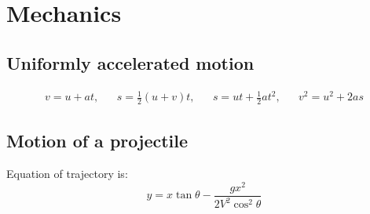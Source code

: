 \documentclass[../"Formula sheet.tex"]{subfiles}
\begin{document}
\section{Mechanics}

\subsection{Uniformly accelerated motion}
\begin{align}
    v = u + at,  &&  s = \frac{1}{2}(u+v)t,  &&  s = ut + \frac{1}{2}at^2,  &&  v^2 = u^2 + 2as
\end{align}

\subsection{Motion of a projectile}
\quad \enspace{} Equation of trajectory is:
\begin{equation}
    y = x \tan{\theta} - \frac{gx^2}{2V^2 \cos^2 \theta}
\end{equation}
\end{document}
